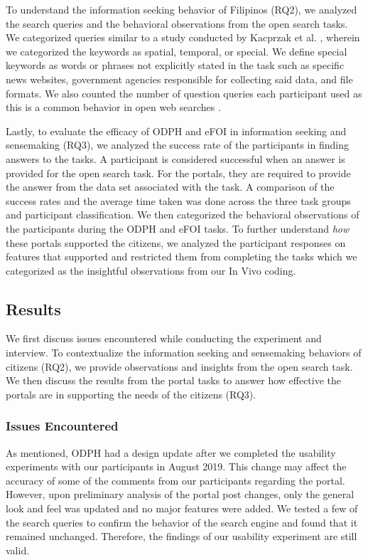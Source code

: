 \documentclass{sigchi}
\begin{document}
To understand the information seeking behavior of Filipinos (RQ2), we analyzed the search queries and the behavioral observations from the open search tasks. We categorized queries similar to a study conducted by Kacprzak et al. \cite{kacprzak2019characterising}, wherein we categorized the keywords as spatial, temporal, or special. We define special keywords as words or phrases not explicitly stated in the task such as specific news websites, government agencies responsible for collecting said data, and file formats. We also counted the number of question queries each participant used as this is a common behavior in open web searches \cite{White2015}.

Lastly, to evaluate the efficacy of ODPH and eFOI in information seeking and sensemaking (RQ3), we analyzed the success rate of the participants in finding answers to the tasks. A participant is considered successful when an answer is provided for the open search task. For the portals, they are required to provide the answer from the data set associated with the task. A comparison of the success rates and the average time taken was done across the three task groups and participant classification. We then categorized the behavioral observations of the participants during the ODPH and eFOI tasks. To further understand \textit{how} these portals supported the citizens, we analyzed the participant responses on features that supported and restricted them from completing the tasks which we categorized as the insightful observations from our In Vivo coding. 

\subsection{Results}
We first discuss issues encountered while conducting the experiment and interview. To contextualize the information seeking and sensemaking behaviors of citizens (RQ2), we provide observations and insights from the open search task. We then discuss the results from the portal tasks to answer how effective the portals are in supporting the needs of the citizens (RQ3).


\subsubsection{Issues Encountered}
As mentioned, ODPH had a design update after we completed the usability experiments with our participants in August 2019. This change may affect the accuracy of some of the comments from our participants regarding the portal. However, upon preliminary analysis of the portal post changes, only the general look and feel was updated and no major features were added. We tested a few of the search queries to confirm the behavior of the search engine and found that it remained unchanged. Therefore, the findings of our usability experiment are still valid.
\end{document}
